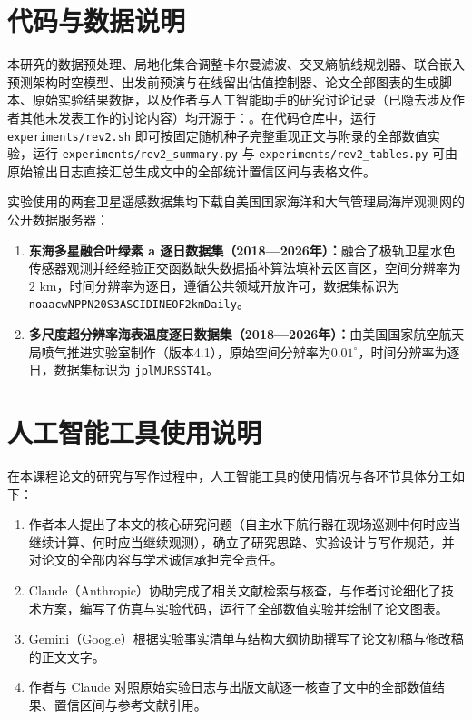 \section{代码与数据说明}

本研究的数据预处理、局地化集合调整卡尔曼滤波、交叉熵航线规划器、联合嵌入预测架构时空模型、出发前预演与在线留出估值控制器、论文全部图表的生成脚本、原始实验结果数据，以及作者与人工智能助手的研究讨论记录（已隐去涉及作者其他未发表工作的讨论内容）均开源于：。在代码仓库中，运行 \texttt{experiments/rev2.sh} 即可按固定随机种子完整重现正文与附录的全部数值实验，运行 \texttt{experiments/rev2\_summary.py} 与 \texttt{experiments/rev2\_tables.py} 可由原始输出日志直接汇总生成文中的全部统计置信区间与表格文件。

实验使用的两套卫星遥感数据集均下载自美国国家海洋和大气管理局海岸观测网的公开数据服务器：
\begin{enumerate}
  \item \textbf{东海多星融合叶绿素 a 逐日数据集（2018—2026年）：}融合了极轨卫星水色传感器观测并经经验正交函数缺失数据插补算法填补云区盲区，空间分辨率为$2\text{ km}$，时间分辨率为逐日，遵循公共领域开放许可，数据集标识为 \texttt{noaacwNPPN20S3ASCIDINEOF2kmDaily}。
  \item \textbf{多尺度超分辨率海表温度逐日数据集（2018—2026年）：}由美国国家航空航天局喷气推进实验室制作（版本4.1），原始空间分辨率为$0.01^\circ$，时间分辨率为逐日，数据集标识为 \texttt{jplMURSST41}。
\end{enumerate}

\section{人工智能工具使用说明}

在本课程论文的研究与写作过程中，人工智能工具的使用情况与各环节具体分工如下：
\begin{enumerate}
  \item 作者本人提出了本文的核心研究问题（自主水下航行器在现场巡测中何时应当继续计算、何时应当继续观测），确立了研究思路、实验设计与写作规范，并对论文的全部内容与学术诚信承担完全责任。
  \item Claude（Anthropic）协助完成了相关文献检索与核查，与作者讨论细化了技术方案，编写了仿真与实验代码，运行了全部数值实验并绘制了论文图表。
  \item Gemini（Google）根据实验事实清单与结构大纲协助撰写了论文初稿与修改稿的正文文字。
  \item 作者与 Claude 对照原始实验日志与出版文献逐一核查了文中的全部数值结果、置信区间与参考文献引用。
\end{enumerate}

